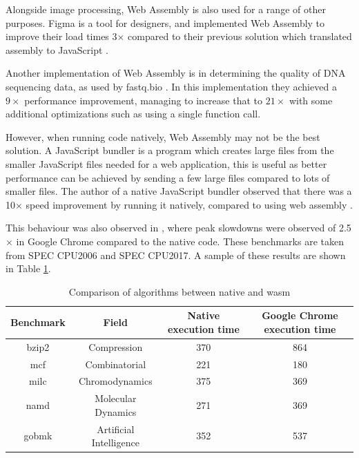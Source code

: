 \documentclass[12pt,a4paper]{article}
\begin{document}
Alongside image processing, Web Assembly is also used for a range of other purposes. Figma is a tool for designers, and implemented Web Assembly to improve their load times 3$\times$ compared to their previous solution which translated assembly to JavaScript \cite{figmawasm}.

Another implementation of Web Assembly is in determining the quality of DNA sequencing data, as used by fastq.bio \cite{fastq}. In this implementation they achieved a $9\times $ performance improvement, managing to increase that to $21 \times$ with some additional optimizations such as using a single function call.


However, when running code natively, Web Assembly may not be the best solution. A JavaScript bundler is a program which creates large files from the smaller JavaScript files needed for a web application, this is useful as better performance can be achieved by sending a few large files compared to lots of smaller files. The author of a native JavaScript bundler observed that there was a 10$\times$ speed improvement by running it natively, compared to using web assembly \cite{esbuild}.

This behaviour was also observed in \cite{jangda2019not}, where peak slowdowns were observed of 2.5$\times$ in Google Chrome compared to the native code. These benchmarks are taken from SPEC CPU2006 and SPEC CPU2017. A sample of these results are shown in Table \ref{native}.
\begin{table}[H]
    \centering
    \caption{Comparison of algorithms between native and wasm}
    \vspace*{6pt}
    \label{native}
    \begin{tabular}{cccc}\hline\hline
        Benchmark & Field                   & Native execution time & Google Chrome execution time \\ \hline
        bzip2     & Compression             & 370                   & 864                          \\
        mcf       & Combinatorial           & 221                   & 180                          \\
        milc      & Chromodynamics          & 375                   & 369                          \\
        namd      & Molecular Dynamics      & 271                   & 369                          \\
        gobmk     & Artificial Intelligence & 352                   & 537
    \end{tabular}
\end{table}
\end{document}
